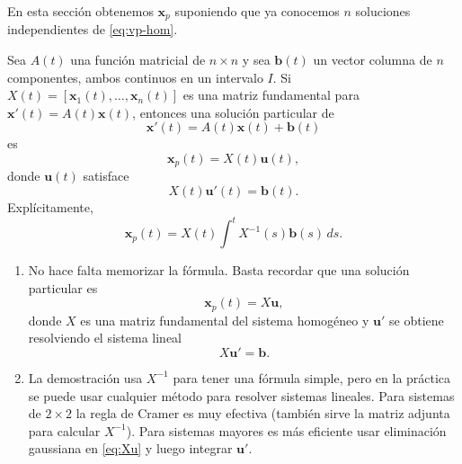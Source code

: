 En esta secci\'on obtenemos $\mathbf x_p$ suponiendo que ya conocemos $n$ soluciones independientes de \eqref{eq:vp-hom}.

\begin{theorem}\label{thm:vp}
Sea $A(t)$ una funci\'on matricial de $n \times n$ y sea $\mathbf{b}(t)$ un vector columna de $n$ componentes, ambos continuos en un intervalo $I$. Si $X(t) = [\mathbf{x}_1(t), \dots, \mathbf{x}_n(t)]$ es una matriz fundamental para $\mathbf{x}'(t) = A(t)\mathbf{x}(t)$, entonces una soluci\'on particular de
\[
\mathbf{x}'(t) = A(t)\mathbf{x}(t) + \mathbf{b}(t)
\]
es
\[
\mathbf{x}_p(t) = X(t)\mathbf{u}(t),
\]
donde $\mathbf{u}(t)$ satisface
\[
X(t)\mathbf{u}'(t) = \mathbf{b}(t).
\]
Expl\'icitamente,
\[
\mathbf{x}_p(t) = X(t) \int^t X^{-1}(s)\mathbf{b}(s) \, ds.
\]
\end{theorem}

\begin{remark}
\begin{enumerate}
    \item No hace falta memorizar la f\'ormula. Basta recordar que una soluci\'on particular es
    \[
    \mathbf{x}_p(t) = X\mathbf{u},
    \]
    donde $X$ es una matriz fundamental del sistema homog\'eneo y $\mathbf{u}'$ se obtiene resolviendo el sistema lineal
    \begin{equation}\label{eq:Xu}
    X\mathbf{u}' = \mathbf{b}.
    \end{equation}

    \item La demostraci\'on usa $X^{-1}$ para tener una f\'ormula simple, pero en la pr\'actica se puede usar cualquier m\'etodo para resolver sistemas lineales. Para sistemas de $2 \times 2$ la regla de Cramer es muy efectiva (tambi\'en sirve la matriz adjunta para calcular $X^{-1}$). Para sistemas mayores es m\'as eficiente usar eliminaci\'on gaussiana en \eqref{eq:Xu} y luego integrar $\mathbf u'$.
\end{enumerate}
\end{remark}

